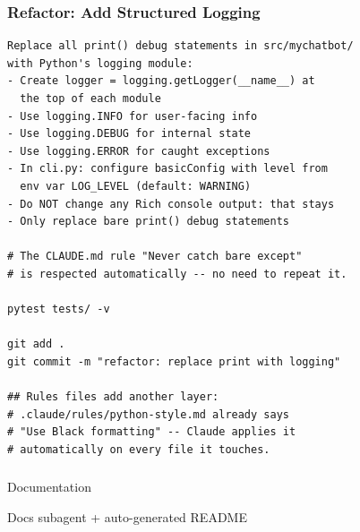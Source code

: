 \begin{frame}[fragile]\frametitle{Refactor: Add Structured Logging}
\begin{lstlisting}
Replace all print() debug statements in src/mychatbot/
with Python's logging module:
- Create logger = logging.getLogger(__name__) at
  the top of each module
- Use logging.INFO for user-facing info
- Use logging.DEBUG for internal state
- Use logging.ERROR for caught exceptions
- In cli.py: configure basicConfig with level from
  env var LOG_LEVEL (default: WARNING)
- Do NOT change any Rich console output: that stays
- Only replace bare print() debug statements

# The CLAUDE.md rule "Never catch bare except"
# is respected automatically -- no need to repeat it.

pytest tests/ -v

git add .
git commit -m "refactor: replace print with logging"

## Rules files add another layer:
# .claude/rules/python-style.md already says
# "Use Black formatting" -- Claude applies it
# automatically on every file it touches.
\end{lstlisting}
\end{frame}


\begin{frame}[fragile]\frametitle{}
\begin{center}
{\Large Documentation}

{\normalsize Docs subagent + auto-generated README}
\end{center}
\end{frame}


